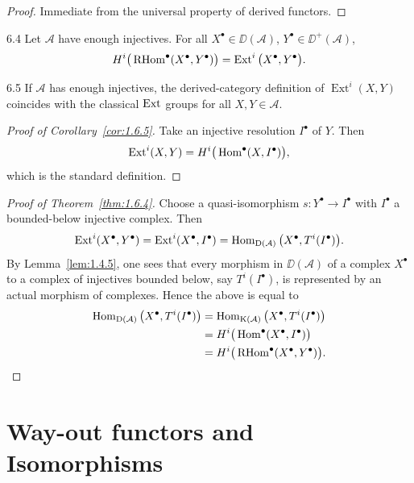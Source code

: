 \begin{proof}
Immediate from the universal property of derived functors.
\end{proof}

\begin{booktheorem}[Yoneda]{6.4}\label{thm:1.6.4}
Let $\mathcal{A}$ have enough injectives.
For all $X^\bullet\in\DD(\mathcal{A})$, $Y^\bullet\in\DD^+(\mathcal{A})$,
\[
H^i\big(\operatorname{RHom}^\bullet(X^\bullet,Y^\bullet)\big)
= \operatorname{Ext}^i\big(X^\bullet,Y^\bullet\big).
\]
\end{booktheorem}

\begin{bookcorollary}{6.5}\label{cor:1.6.5}
If $\mathcal{A}$ has enough injectives, the derived-category definition of $\operatorname{Ext}^i(X,Y)$
coincides with the classical $\operatorname{Ext}$ groups for all $X,Y\in\mathcal{A}$.
\end{bookcorollary}

\begin{proof}[Proof of Corollary~\ref{cor:1.6.5}]
Take an injective resolution $I^\bullet$ of $Y$. Then
\[
\operatorname{Ext}^i(X,Y) = H^i\big(\operatorname{Hom}^\bullet(X,I^\bullet)\big),
\]
which is the standard definition.
\end{proof}

\begin{proof}[Proof of Theorem~\ref{thm:1.6.4}]
Choose a quasi-isomorphism $s\colon Y^\bullet\to I^\bullet$ with $I^\bullet$ a bounded-below injective complex. Then
\[
\operatorname{Ext}^i(X^\bullet,Y^\bullet)
= \operatorname{Ext}^i(X^\bullet,I^\bullet)
= \operatorname{Hom}_{\operatorname{D}(\mathcal{A})}\big(X^\bullet,T^i(I^\bullet)\big).
\]
By Lemma~\ref{lem:1.4.5}, one sees that every morphism in $\DD(\mathcal{A})$ of
a complex $X^\bullet$ to a complex of injectives bounded below, say $T^i(I^\bullet)$,
is represented by an actual morphism of complexes. Hence the above
is equal to
\[
\begin{aligned}
\operatorname{Hom}_{\operatorname{D}(\mathcal{A})}\big(X^\bullet,T^i(I^\bullet)\big)
&= \operatorname{Hom}_{\operatorname{K}(\mathcal{A})}\big(X^\bullet,T^i(I^\bullet)\big) \\
&= H^i\big(\operatorname{Hom}^\bullet(X^\bullet,I^\bullet)\big) \\
&= H^i\big(\operatorname{RHom}^\bullet(X^\bullet,Y^\bullet)\big).
\end{aligned}
\]
\end{proof}

\section{Way-out functors and Isomorphisms}\label{sec:1.7}

